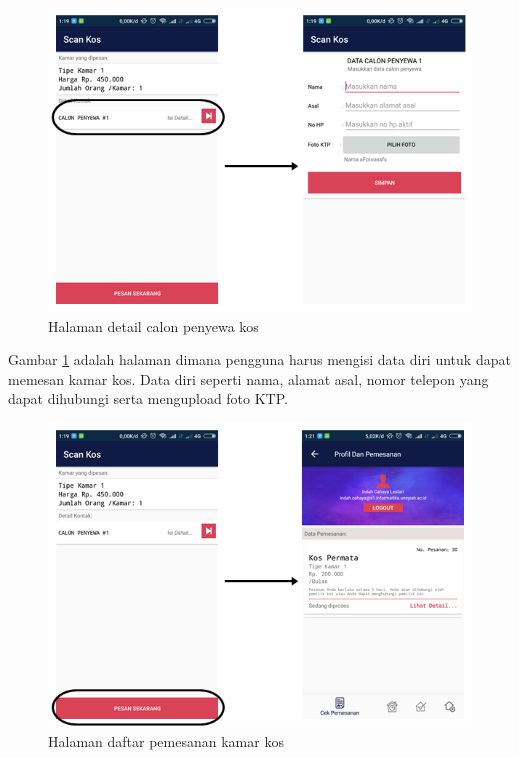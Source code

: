 		\begin{figure}[H]
			\centering
			\includegraphics[width=\textwidth]{gambar/and/and5}
			\caption{Halaman detail calon penyewa kos}
			\label{and11}
		\end{figure}
		
		Gambar \ref{and11} adalah halaman dimana pengguna harus mengisi data diri untuk dapat memesan kamar kos. Data diri seperti nama, alamat asal, nomor telepon yang dapat dihubungi serta mengupload foto KTP. 
		
		\begin{figure}[H]
			\centering
			\includegraphics[width=\textwidth]{gambar/and/and6}
			\caption{Halaman daftar pemesanan kamar kos}
			\label{and12}
		\end{figure}
		
